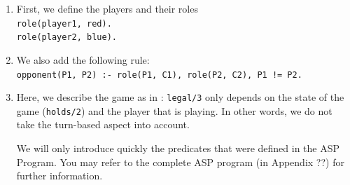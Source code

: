 \begin{enumerate}
\item First, we define the players and their roles\\
\texttt{role(player1, red).\\
role(player2, blue).\\}

\item We also add the following rule:\\
\texttt{opponent(P1, P2) :- role(P1, C1), role(P2, C2), P1 != P2.}

\item Here, we describe the game as in \cite{thielscher2009answer}: \texttt{legal/3} only depends on the state of the game (\texttt{holds/2}) and the player that is playing. In other words, we do not take the turn-based aspect into account.

\smallskip

We will only introduce quickly the predicates that were defined in the ASP Program. You may refer to the complete ASP program (in Appendix ??) for further information. 


\end{enumerate}
